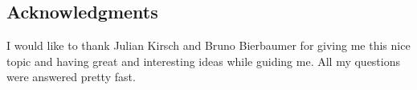 \newpage
\vspace*{3.5cm}
\begin{center}
\begin{minipage}{12.5cm}
\section*{Acknowledgments}%
I would like to thank Julian Kirsch and Bruno Bierbaumer for giving me this nice topic and having great and interesting ideas while guiding me. All my questions were answered pretty fast.
\end{minipage}
\end{center}
